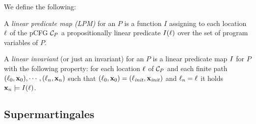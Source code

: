\smallskip
\begin{definition} We define the 
following:
\begin{compactenum}
\item
A \emph{linear predicate map (LPM)} for an \APP{} $P$ is a function $I$ 
assigning to each location $\ell$ of the pCFG $\mathcal{C}_P$ a propositionally 
linear predicate $I(\ell)$ over the set of program variables of $P$.
\item
A \emph{linear invariant} (or just an invariant) for an \APP{} $P$ is 
a linear predicate map $I$ for $P$ with
the following property: for each location $\ell$ of $\mathcal{C}_P$ and each finite 
path $(\ell_0,\mathbf{x}_0),\cdots,(\ell_n,\mathbf{x}_n)$ such that 
$(\ell_0,\mathbf{x}_0)=(\ell_{\mathit{init}},\mathbf{x}_{\mathit{init}})$ and $\ell_n = \ell$ it holds
$\mathbf{x}_n\models I(\ell)$.
\end{compactenum}
\end{definition}



%



\subsection{Supermartingales}

